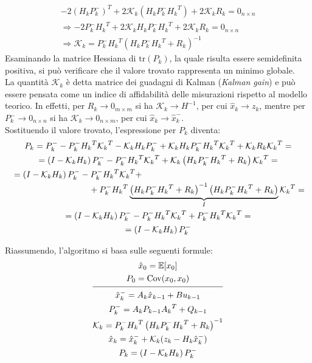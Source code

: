 \documentclass[12pt,a4paper,openright,twoside]{book}
\begin{document}
\begin{gather*}
-2(H_kP_k^-)^T+2\mathcal{K}_k\left(H_kP_k^-{H_k}^T\right)+2\mathcal{K}_kR_k=0_{n\times n} \\
\Rightarrow-2P_k^-{H_k}^T+2\mathcal{K}_kH_kP_k^-{H_k}^T+2\mathcal{K}_kR_k=0_{n\times n} \\
\Rightarrow\mathcal{K}_k=P_k^-{H_k}^T\left(H_kP_k^-{H_k}^T+R_k\right)^{-1}
\end{gather*}
Esaminando la matrice Hessiana di $\mathrm{tr}(P_k)$, la quale risulta essere semidefinita positiva, si può verificare che il valore trovato rappresenta un minimo globale. \\
La quantità $\mathcal{K}_k$ è detta matrice dei guadagni di Kalman (\textit{Kalman gain}) e può essere pensata come un indice di affidabilità delle misurazioni rispetto al modello teorico. In effetti, per $R_k\to 0_{m\times m}$ si ha $\mathcal{K}_k\to H^{-1}$, per cui $\hat{x}_k\to z_k$, mentre per $P_k^-\to 0_{n\times n}$ si ha $\mathcal{K}_k\to 0_{n\times m}$, per cui $\hat{x}_k\to \hat{x}_k^-$. \\

Sostituendo il valore trovato, l'espressione per $P_k$ diventa:
\begin{gather*}
P_k=P_k^--P_k^-{H_k}^T{\mathcal{K}_k}^T-\mathcal{K}_kH_kP_k^-+\mathcal{K}_kH_kP_k^-{H_k}^T{\mathcal{K}_k}^T+\mathcal{K}_kR_k{\mathcal{K}_k}^T= \\
=\left(I-\mathcal{K}_kH_k\right)P_k^--P_k^-{H_k}^T{\mathcal{K}_k}^T+\mathcal{K}_k\left(H_kP_k^-{H_k}^T+R_k\right){\mathcal{K}_k}^T= \\
\begin{multlined}[\textwidth]
=\left(I-\mathcal{K}_kH_k\right)P_k^--P_k^-{H_k}^T{\mathcal{K}_k}^T+ \\
+P_k^-{H_k}^T\underbrace{\left(H_kP_k^-{H_k}^T+R_k\right)^{-1}\left(H_kP_k^-{H_k}^T+R_k\right)}_{I}{\mathcal{K}_k}^T=
\end{multlined} \\
=\left(I-\mathcal{K}_kH_k\right)P_k^--P_k^-{H_k}^T{\mathcal{K}_k}^T+P_k^-{H_k}^T{\mathcal{K}_k}^T= \\
=\left(I-\mathcal{K}_kH_k\right)P_k^-
\end{gather*}

Riassumendo, l'algoritmo si basa sulle seguenti formule:
\begin{gather*}
\hat{x}_0=\mathbb{E}[x_0] \\
P_0=\mathrm{Cov}(x_0,x_0) \\[0.2\baselineskip]
\hline \\[-0.8\baselineskip]
\hat{x}_k^-=A_k\hat{x}_{k-1}+Bu_{k-1} \\
P_k^-=A_kP_{k-1}{A_k}^T+Q_{k-1} \\
\mathcal{K}_k=P_k^-{H_k}^T\left(H_kP_k^-{H_k}^T+R_k\right)^{-1} \\
\hat{x}_k=\hat{x}_k^-+\mathcal{K}_k(z_k-H_k\hat{x}_k^-) \\
P_k=\left(I-\mathcal{K}_kH_k\right)P_k^-
\end{gather*}
\end{document}
